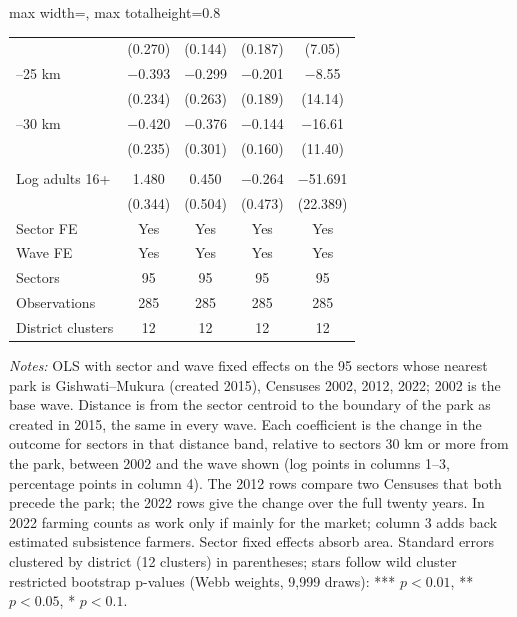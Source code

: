 \documentclass[11pt]{article}
\begin{document}
\begin{table}[H]
\begin{adjustbox}{max width=\textwidth, max totalheight=0.8\textheight}
\begin{tabular}{lcccc}
 & (0.270) & (0.144) & (0.187) & (7.05) \\
\quad 20--25 km & $-$0.393 & $-$0.299 & $-$0.201 & $-$8.55 \\
 & (0.234) & (0.263) & (0.189) & (14.14) \\
\quad 25--30 km & $-$0.420 & $-$0.376 & $-$0.144 & $-$16.61 \\
 & (0.235) & (0.301) & (0.160) & (11.40) \\
\addlinespace
\multicolumn{5}{l}{\textit{Controls}} \\
\quad Log adults 16+ & 1.480 & 0.450 & $-$0.264 & $-$51.691 \\
 & (0.344) & (0.504) & (0.473) & (22.389) \\
\midrule
Sector FE & Yes & Yes & Yes & Yes \\
Wave FE & Yes & Yes & Yes & Yes \\
Sectors & 95 & 95 & 95 & 95 \\
Observations & 285 & 285 & 285 & 285 \\
District clusters & 12 & 12 & 12 & 12 \\
\bottomrule
\end{tabular}
\end{adjustbox}
\begin{minipage}{0.97\textwidth}\scriptsize
\textit{Notes:} OLS with sector and wave fixed effects on the 95 sectors whose nearest park is Gishwati--Mukura (created 2015), Censuses 2002, 2012, 2022; 2002 is the base wave. Distance is from the sector centroid to the boundary of the park as created in 2015, the same in every wave. Each coefficient is the change in the outcome for sectors in that distance band, relative to sectors 30 km or more from the park, between 2002 and the wave shown (log points in columns 1--3, percentage points in column 4). The 2012 rows compare two Censuses that both precede the park; the 2022 rows give the change over the full twenty years. In 2022 farming counts as work only if mainly for the market; column 3 adds back estimated subsistence farmers. Sector fixed effects absorb area. Standard errors clustered by district (12 clusters) in parentheses; stars follow wild cluster restricted bootstrap p-values (Webb weights, 9,999 draws): *** $p<0.01$, ** $p<0.05$, * $p<0.1$.
\end{minipage}
\end{table}
\clearpage
\end{document}

